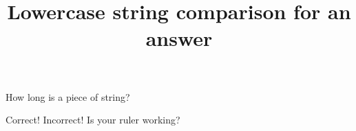 \documentclass[hidesidemenu]{webquiz}
\title{Lowercase string comparison for an answer}
\begin{document}
  \begin{question}     %
     How long is a piece of string?

     \whenRight Correct!
     \whenWrong Incorrect! Is your ruler working?
  \end{question}
\end{document}

